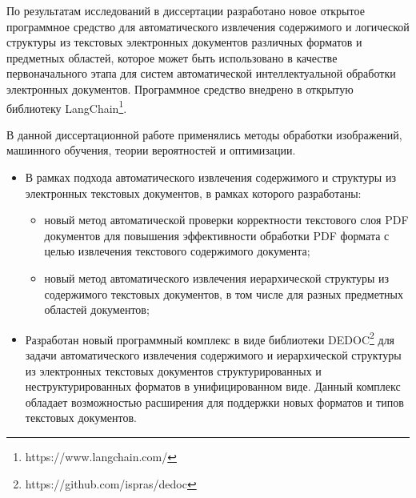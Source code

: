 \underline{\textbf{{\influenceTXT}}} По результатам исследований в диссертации разработано новое открытое программное средство для автоматического извлечения содержимого и логической структуры из текстовых электронных документов различных форматов и предметных областей, которое может быть использовано в качестве первоначального этапа для систем автоматической интеллектуальной обработки электронных документов. Программное средство внедрено в открытую библиотеку LangChain\footnote{https://www.langchain.com/}.



\underline{\textbf{{\methodsTXT}}} В данной диссертационной работе применялись методы обработки изображений, машинного обучения, теории вероятностей и оптимизации.


\underline{\textbf{{}}}
\begin{itemize}
        \item В рамках подхода автоматического извлечения содержимого и структуры из электронных текстовых документов, в рамках которого разработаны:
        \begin{itemize}
            \item новый метод автоматической проверки корректности текстового слоя PDF документов для повышения эффективности обработки PDF формата с целью извлечения текстового содержимого документа;
            \item новый метод автоматического извлечения иерархической структуры из содержимого текстовых документов, в том числе для разных предметных областей документов;
        \end{itemize}
        \item Разработан новый программный комплекс в виде библиотеки DEDOC\footnote{https://github.com/ispras/dedoc} для задачи автоматического извлечения содержимого и иерархической структуры из электронных текстовых документов структурированных и неструктурированных форматов в унифицированном виде. Данный комплекс обладает возможностью расширения для поддержки новых форматов и типов текстовых документов.
\end{itemize}



